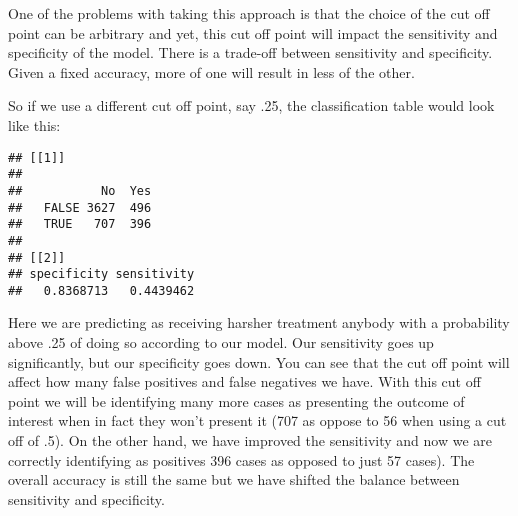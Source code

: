 \documentclass[
]{book}
\newenvironment{Shaded}{\begin{snugshade}}{\end{snugshade}}
\newcommand{\ControlFlowTok}[1]{\textcolor[rgb]{0.13,0.29,0.53}{\textbf{#1}}}
\newcommand{\DecValTok}[1]{\textcolor[rgb]{0.00,0.00,0.81}{#1}}
\newcommand{\FunctionTok}[1]{\textcolor[rgb]{0.13,0.29,0.53}{\textbf{#1}}}
\newcommand{\NormalTok}[1]{#1}
\newcommand{\OtherTok}[1]{\textcolor[rgb]{0.56,0.35,0.01}{#1}}
\newcommand{\SpecialCharTok}[1]{\textcolor[rgb]{0.81,0.36,0.00}{\textbf{#1}}}
\newcommand{\StringTok}[1]{\textcolor[rgb]{0.31,0.60,0.02}{#1}}
\begin{document}
One of the problems with taking this approach is that the choice of the cut off point can be arbitrary and yet, this cut off point will impact the sensitivity and specificity of the model. There is a trade-off between sensitivity and specificity. Given a fixed accuracy, more of one will result in less of the other.

So if we use a different cut off point, say .25, the classification table would look like this:

\begin{Shaded}
\end{Shaded}

\begin{verbatim}
## [[1]]
##        
##           No  Yes
##   FALSE 3627  496
##   TRUE   707  396
## 
## [[2]]
## specificity sensitivity 
##   0.8368713   0.4439462
\end{verbatim}

Here we are predicting as receiving harsher treatment anybody with a probability above .25 of doing so according to our model. Our sensitivity goes up significantly, but our specificity goes down. You can see that the cut off point will affect how many false positives and false negatives we have. With this cut off point we will be identifying many more cases as presenting the outcome of interest when in fact they won't present it (707 as oppose to 56 when using a cut off of .5). On the other hand, we have improved the sensitivity and now we are correctly identifying as positives 396 cases as opposed to just 57 cases). The overall accuracy is still the same but we have shifted the balance between sensitivity and specificity.
\end{document}

